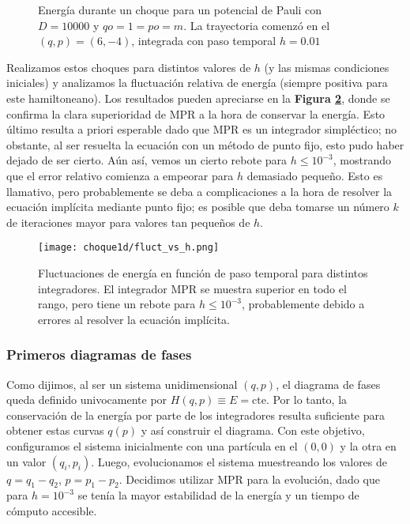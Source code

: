 \begin{figure}[h]
	\centering
	\caption{Energía durante un choque para un potencial de Pauli con $D = 10000$ y $qo = 1 = po = m$. La trayectoria comenzó en el $(q, p) = (6, -4)$, integrada con paso temporal $h=0.01$}
	\label{fig:energ_choq}
\end{figure}

Realizamos estos choques para distintos valores de $h$ (y las mismas condiciones iniciales) y analizamos la fluctuación relativa de energía (siempre positiva para este hamiltoneano).
Los resultados pueden apreciarse en la \textbf{Figura \ref{fig:flucvsh}}, donde se confirma la clara superioridad de MPR a la hora de conservar la energía.
Esto último resulta a priori esperable dado que MPR es un integrador simpléctico; no obstante, al ser resuelta la ecuación con un método de punto fijo, esto pudo haber dejado de ser cierto.
Aún así, vemos un cierto rebote para $h\leq10^{-3}$, mostrando que el error relativo comienza a empeorar para $h$ demasiado pequeño.
Esto es llamativo, pero probablemente se deba a complicaciones a la hora de resolver la ecuación implícita mediante punto fijo; es posible que deba tomarse un número $k$ de iteraciones mayor
para valores tan pequeños de $h$.

\begin{figure}[h]
	\centering
	\texttt{[image: choque1d/fluct\_vs\_h.png]}
	\caption{Fluctuaciones de energía en función de paso temporal para distintos integradores.
	El integrador MPR se muestra superior en todo el rango, pero tiene un rebote para $h\leq10^{-3}$, probablemente debido a errores al resolver la ecuación implícita.}
	\label{fig:flucvsh}
\end{figure}

\subsubsection{Primeros diagramas de fases}

Como dijimos, al ser un sistema unidimensional $(q,p)$, el diagrama de fases queda definido univocamente por $H(q,p)\equiv E = \text{cte}$.
Por lo tanto, la conservación de la energía por parte de los integradores resulta suficiente para obtener estas curvas $q(p)$ y así construir el diagrama.
Con este objetivo, configuramos el sistema inicialmente con una partícula en el $(0,0)$ y la otra en un valor $(q_i, p_i)$.
Luego, evolucionamos el sistema muestreando los valores de $q = q_1 - q_2$, $p = p_1 - p_2$.
Decidimos utilizar MPR para la evolución, dado que para $h=10^{-3}$ se tenía la mayor estabilidad de la energía y un tiempo de cómputo accesible.

